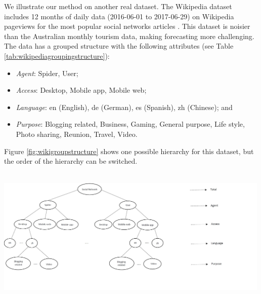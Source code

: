\documentclass[11pt,a4paper,]{article}
\providecommand{\tightlist}{%
  \setlength{\itemsep}{0pt}\setlength{\parskip}{0pt}}
\let\origfigure\figure
\let\endorigfigure\endfigure
\renewenvironment{figure}[1][2] {
    \expandafter\origfigure\expandafter[!htbp]
} {
    \endorigfigure
}
\begin{document}
We illustrate our method on another real dataset. The Wikipedia dataset includes 12 months of daily data (2016-06-01 to 2017-06-29) on Wikipedia pageviews for the most popular social networks articles \autocite{ashouri2018}. This dataset is noisier than the Australian monthly tourism data, making forecasting more challenging. The data has a grouped structure with the following attributes (see Table \ref{tab:wikipediagroupingstructure}):

\begin{itemize}
\tightlist
\item
  \emph{Agent}: Spider, User;
\item
  \emph{Access}: Desktop, Mobile app, Mobile web;
\item
  \emph{Language}: en (English), de (German), es (Spanish), zh (Chinese); and
\item
  \emph{Purpose}: Blogging related, Business, Gaming, General purpose, Life style, Photo sharing, Reunion, Travel, Video.
\end{itemize}

Figure \ref{fig:wikigroupstructure} shows one possible hierarchy for this dataset, but the order of the hierarchy can be switched.

\begin{figure}

{\centering \includegraphics[width=500px,height=250px]{Paper-Figures/Wiki_group_structure} 

}

\caption{One possible hierarchical structure for the Wikipedia pageviews dataset.}\label{fig:wikigroupstructure}
\end{figure}
\end{document}
